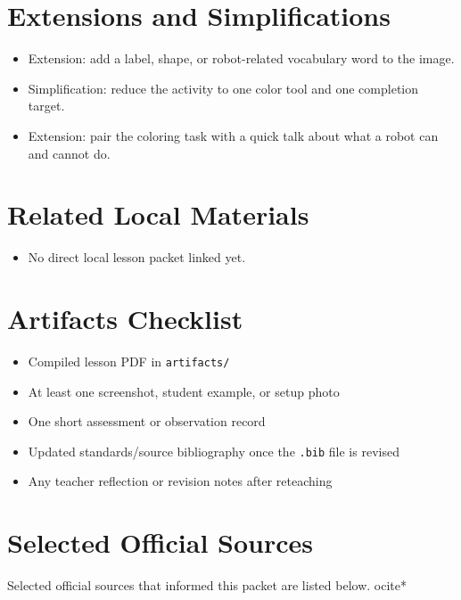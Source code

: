 \documentclass[11pt]{article}
\begin{document}
\section*{Extensions and Simplifications}
\begin{itemize}[leftmargin=*]
\item Extension: add a label, shape, or robot-related vocabulary word to the image.
\item Simplification: reduce the activity to one color tool and one completion target.
\item Extension: pair the coloring task with a quick talk about what a robot can and cannot do.
\end{itemize}

\section*{Related Local Materials}
\begin{itemize}[leftmargin=*]
\item No direct local lesson packet linked yet.
\end{itemize}

\section*{Artifacts Checklist}
\begin{itemize}[leftmargin=*]
\item Compiled lesson PDF in \texttt{artifacts/}
\item At least one screenshot, student example, or setup photo
\item One short assessment or observation record
\item Updated standards/source bibliography once the \texttt{.bib} file is revised
\item Any teacher reflection or revision notes after reteaching
\end{itemize}

\section*{Selected Official Sources}
Selected official sources that informed this packet are listed below.
ocite{*}



\end{document}

